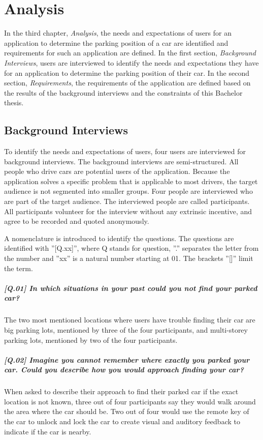 \chapter{Analysis}
In the third chapter, \textit{Analysis}, the needs and expectations of users for an application to determine the parking position of a car are identified and requirements for such an application are defined.
In the first section, \textit{Background Interviews}, users are interviewed to identify the needs and expectations they have for an application to determine the parking position of their car.
In the second section, \textit{Requirements}, the requirements of the application are defined based on the results of the background interviews and the constraints of this Bachelor thesis.

\section{Background Interviews}

To identify the needs and expectations of users, four users are interviewed for background interviews. The background interviews are semi-structured. All people who drive cars are potential users of the application. Because the application solves a specific problem that is applicable to most drivers, the target audience is not segmented into smaller groups. Four people are interviewed who are part of the target audience. The interviewed people are called participants. All participants volunteer for the interview without any extrinsic incentive, and agree to be recorded and quoted anonymously. \cite{Abras2004} \cite{wilson2013interview}

A nomenclature is introduced to identify the questions. The questions are identified with ''[Q.xx]'', where Q stands for question, ''.'' separates the letter from the number and ''xx'' is a natural number starting at 01. The brackets ''[]'' limit the term.

\paragraph{[Q.01] In which situations in your past could you not find your parked car?}
The two most mentioned locations where users have trouble finding their car are big parking lots, mentioned by three of the four participants, and multi-storey parking lots, mentioned by two of the four participants.

\paragraph{[Q.02] Imagine you cannot remember where exactly you parked your car. Could you describe how you would approach finding your car?}
When asked to describe their approach to find their parked car if the exact location is not known, three out of four participants say they would walk around the area where the car should be. Two out of four would use the remote key of the car to unlock and lock the car to create visual and auditory feedback to indicate if the car is nearby.

